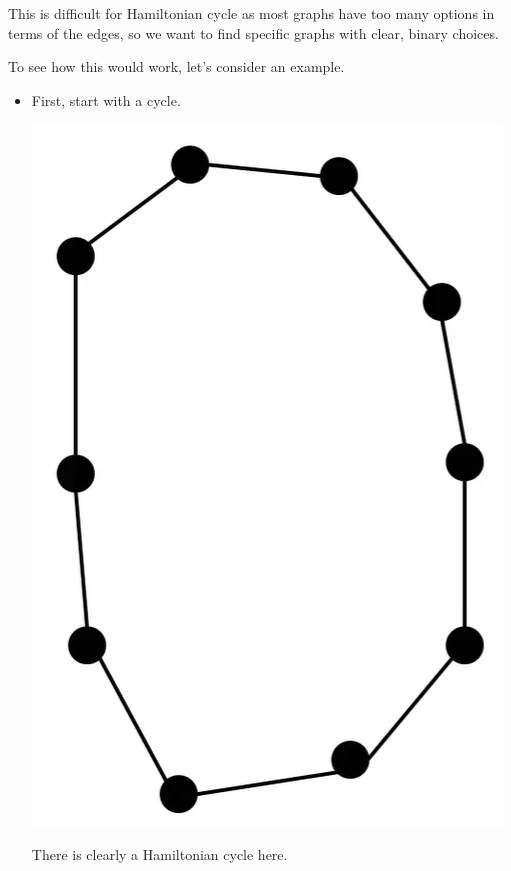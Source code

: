 \documentclass[letterpaper]{article}
\begin{document}
\bigskip 

This is difficult for Hamiltonian cycle as most graphs have too many options in terms of the edges, so we want to find specific graphs with clear, binary choices. 

\bigskip 

To see how this would work, let's consider an example. 
\begin{itemize}
    \item First, start with a cycle. 
    \begin{center}
        \includegraphics[scale=0.35]{assets/zoe_ham_1.png}
    \end{center}
    There is clearly a Hamiltonian cycle here.


\end{itemize}
\end{document}
